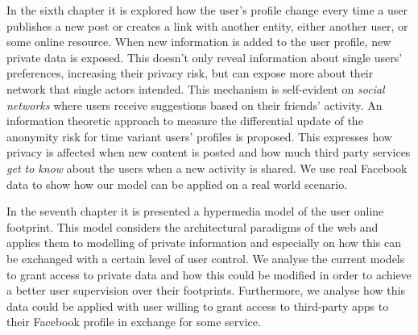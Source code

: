 In the sixth chapter it is explored how the user's profile change every time a user publishes a new post or creates a link with another entity, either another user, or some online resource. When new information is added to the user profile, new private data is exposed. This doesn't only reveal information about single users' preferences, increasing their privacy risk, but can expose more about their network that single actors intended. This mechanism is self-evident on \emph{social networks} where users receive suggestions based on their friends’ activity. An information theoretic approach to measure the differential update of the anonymity risk for time variant users’ profiles is proposed. This expresses how privacy is affected when new content is posted and how much third party services \emph{get to know} about the users when a new activity is shared. We use real Facebook data to show how our model can be applied on a real world scenario.

In the seventh chapter it is presented a hypermedia model of the user online footprint. This model considers the architectural paradigms of the web and applies them to modelling of private information and especially on how this can be exchanged with a certain level of user control. We analyse the current models to grant access to private data and how this could be modified in order to achieve a better user supervision over their footprints. Furthermore, we analyse how this data could be applied with user willing to grant access to third-party apps to their Facebook profile in exchange for some service.